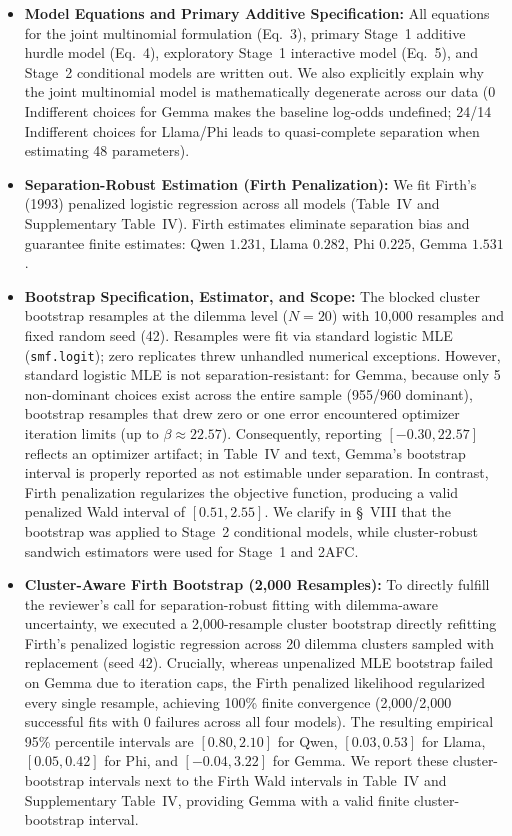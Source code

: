 \documentclass[11pt]{article}
\begin{document}
\begin{itemize}[leftmargin=*]
\item \textbf{Model Equations and Primary Additive Specification:} All equations for the joint multinomial formulation (Eq.~3), primary Stage~1 additive hurdle model (Eq.~4), exploratory Stage~1 interactive model (Eq.~5), and Stage~2 conditional models are written out. We also explicitly explain why the joint multinomial model is mathematically degenerate across our data (0 Indifferent choices for Gemma makes the baseline log-odds undefined; 24/14 Indifferent choices for Llama/Phi leads to quasi-complete separation when estimating 48 parameters).
\item \textbf{Separation-Robust Estimation (Firth Penalization):} We fit Firth's (1993) penalized logistic regression across all models (Table~IV and Supplementary Table~IV). Firth estimates eliminate separation bias and guarantee finite estimates: Qwen $1.231$, Llama $0.282$, Phi $0.225$, Gemma $1.531$.
\item \textbf{Bootstrap Specification, Estimator, and Scope:} The blocked cluster bootstrap resamples at the dilemma level ($N=20$) with 10,000 resamples and fixed random seed (42). Resamples were fit via standard logistic MLE (\texttt{smf.logit}); zero replicates threw unhandled numerical exceptions. However, standard logistic MLE is not separation-resistant: for Gemma, because only 5 non-dominant choices exist across the entire sample (955/960 dominant), bootstrap resamples that drew zero or one error encountered optimizer iteration limits (up to $\beta \approx 22.57$). Consequently, reporting $[-0.30, 22.57]$ reflects an optimizer artifact; in Table~IV and text, Gemma's bootstrap interval is properly reported as not estimable under separation. In contrast, Firth penalization regularizes the objective function, producing a valid penalized Wald interval of $[0.51, 2.55]$. We clarify in \S~VIII that the bootstrap was applied to Stage~2 conditional models, while cluster-robust sandwich estimators were used for Stage~1 and 2AFC.
\item \textbf{Cluster-Aware Firth Bootstrap (2,000 Resamples):} To directly fulfill the reviewer's call for separation-robust fitting with dilemma-aware uncertainty, we executed a 2,000-resample cluster bootstrap directly refitting Firth's penalized logistic regression across 20 dilemma clusters sampled with replacement (seed 42). Crucially, whereas unpenalized MLE bootstrap failed on Gemma due to iteration caps, the Firth penalized likelihood regularized every single resample, achieving 100\% finite convergence (2,000/2,000 successful fits with 0 failures across all four models). The resulting empirical 95\% percentile intervals are $[0.80, 2.10]$ for Qwen, $[0.03, 0.53]$ for Llama, $[0.05, 0.42]$ for Phi, and $[-0.04, 3.22]$ for Gemma. We report these cluster-bootstrap intervals next to the Firth Wald intervals in Table~IV and Supplementary Table~IV, providing Gemma with a valid finite cluster-bootstrap interval.

\end{itemize}
\end{document}
